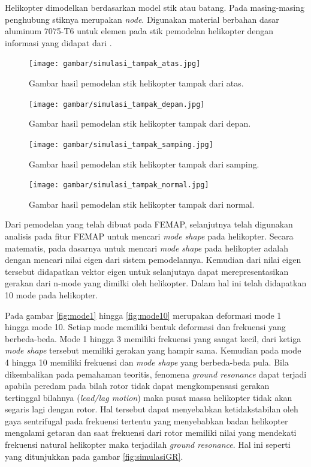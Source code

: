 Helikopter dimodelkan berdasarkan model stik atau batang. Pada masing-masing penghubung stiknya merupakan \textit{node}. Digunakan material berbahan dasar aluminum 7075-T6 untuk elemen pada stik pemodelan helikopter dengan informasi yang didapat dari \cite{ASTM}.

\begin{figure}[H]
	\centering
	\texttt{[image: gambar/simulasi\_tampak\_atas.jpg]}
	\caption{Gambar hasil pemodelan stik helikopter tampak dari atas.}
	\label{fig:simulasi_tampak_atas}
\end{figure}

\begin{figure}[H]
	\centering
	\texttt{[image: gambar/simulasi\_tampak\_depan.jpg]}
	\caption{Gambar hasil pemodelan stik helikopter tampak dari depan.}
	\label{fig:simulasi_tampak_depan}
\end{figure}

\begin{figure}[H]
	\centering
	\texttt{[image: gambar/simulasi\_tampak\_samping.jpg]}
	\caption{Gambar hasil pemodelan stik helikopter tampak dari samping.}
	\label{fig:simulasi_tampak_samping}
\end{figure}

\begin{figure}[H]
	\centering
	\texttt{[image: gambar/simulasi\_tampak\_normal.jpg]}
	\caption{Gambar hasil pemodelan stik helikopter tampak dari normal.}
	\label{fig:simulasi_tampak_normal}
\end{figure}

Dari pemodelan yang telah dibuat pada FEMAP, selanjutnya telah digunakan analisis pada fitur FEMAP untuk mencari \textit{mode shape} pada helikopter. Secara matematis, pada dasarnya untuk mencari \textit{mode shape} pada helikopter adalah dengan mencari nilai eigen dari sistem pemodelannya. Kemudian dari nilai eigen tersebut didapatkan vektor eigen untuk selanjutnya dapat merepresentasikan gerakan dari n-mode yang dimilki oleh helikopter. Dalam hal ini telah didapatkan 10 mode pada helikopter.

Pada gambar \ref{fig:mode1} hingga \ref{fig:mode10} merupakan deformasi mode 1 hingga mode 10. Setiap mode memiliki bentuk deformasi dan frekuensi yang berbeda-beda. Mode 1 hingga 3 memiliki frekuensi yang sangat kecil, dari ketiga \textit{mode shape} tersebut memiliki gerakan yang hampir sama. Kemudian pada mode 4 hingga 10 memiliki frekuensi dan \textit{mode shape} yang berbeda-beda pula. Bila dikembalikan pada pemahaman teoritis, fenomena \textit{ground resonance} dapat terjadi apabila peredam pada bilah rotor tidak dapat mengkompensasi gerakan tertinggal bilahnya (\textit{lead/lag motion}) maka pusat massa helikopter tidak akan segaris lagi dengan rotor. Hal tersebut dapat menyebabkan ketidakstabilan oleh gaya sentrifugal pada frekuensi tertentu yang menyebabkan badan helikopter mengalami getaran dan saat frekuensi dari rotor memiliki nilai yang mendekati frekuensi natural helikopter maka terjadilah \textit{ground resonance}. Hal ini seperti yang ditunjukkan pada gambar \ref{fig:simulasiGR}.

